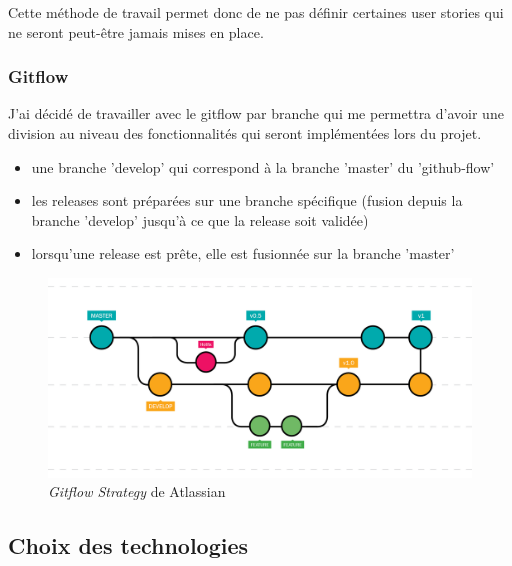 Cette méthode de travail permet donc de ne pas définir certaines user stories qui ne seront peut-être jamais mises en place.

\subsubsection{Gitflow}

J'ai décidé de travailler avec le gitflow par branche qui me permettra d'avoir une division au niveau des fonctionnalités qui seront implémentées lors du projet.

\begin{itemize}
  \item une branche 'develop' qui correspond à la branche 'master' du 'github-flow'
  \item les releases sont préparées sur une branche spécifique (fusion depuis la branche 'develop' jusqu'à ce que la release soit validée)
  \item lorsqu'une release est prête, elle est fusionnée sur la branche 'master'
\end{itemize}

\begin{figure}[H]
  \centering
  \includegraphics[width=0.75\linewidth]{img/gitflow.png}
  \caption{ \textit{Gitflow Strategy} de Atlassian}
  \label{Gitflow}
\end{figure}


\subsection{Choix des technologies}

